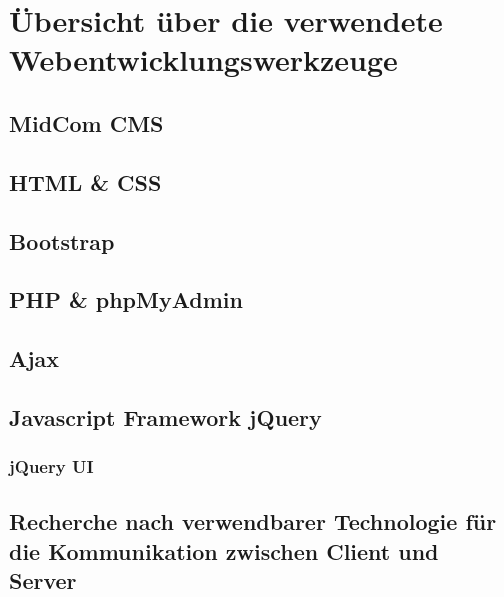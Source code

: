 \chapter{Übersicht über die verwendete Webentwicklungswerkzeuge}
\label{cha:webentwicklungswerkzeuge}

\section{MidCom CMS}
\label{sec:midCom cms}

\section{HTML \& CSS}
\label{sec:html und css}

\section{Bootstrap}
\label{sec:bootstrap}

\section{PHP \& phpMyAdmin}
\label{sec:php und phpMyAdmin}

\section{Ajax}
\label{sec:Ajax}

\section{Javascript Framework jQuery}
\label{sec:jquery}

\subsection{jQuery UI}

\section{Recherche nach verwendbarer Technologie für die Kommunikation zwischen Client und Server}
\label{sec:kommunikation zwischen client und server}

